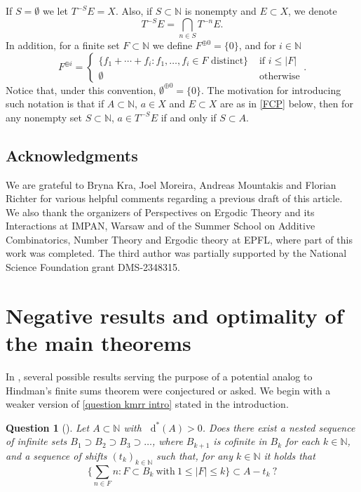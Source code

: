 \documentclass[letter, 11pt]{article}
\newtheorem{question}[theo]{Question}
\theoremstyle{definition}
\theoremstyle{plain}
\newcommand{\N}{\mathbb{N}}
\newcommand*\diff{\mathop{}\!\mathrm{d}}
\newcommand{\1}{\mathbbm{1}}
\begin{document}
If $S=\emptyset$ we let $T^{-S}E=X$. Also, if $S\subset \N$ is nonempty and $E\subset X$, we denote 
$$T^{-S}E=\bigcap_{n\in S} T^{-n}E. $$
In addition, for a finite set 
$F\subset \N$ we define $F^{\oplus 0}=\{0\}$, and for $i\in \N$ 
$$F^{\oplus i}=\begin{cases}
    \{f_1+\cdots +f_i :f_1,\ldots,f_i\in F \text{ distinct}\} & \text{ if } i\leq |F|\\
    \emptyset & \text{ otherwise}
\end{cases}.$$ 
Notice that, under this convention, $\emptyset^{\oplus 0}=\{0\}$. The motivation for introducing such notation is that if $A \subset \N$, $a \in X$ and $E \subset X$ are as in \cref{FCP} below, then for any nonempty set $S \subset \N$, $a \in T^{-S} E$ if and only if $S \subset A$. 
\subsection*{Acknowledgments}
We are grateful to Bryna Kra, Joel Moreira, Andreas Mountakis and Florian Richter for various helpful comments 
regarding a previous draft of this article. We also thank the organizers of 
Perspectives on Ergodic Theory and its Interactions at IMPAN, Warsaw and of the 
Summer School on Additive Combinatorics, Number Theory and Ergodic theory at 
EPFL, where part of this work was completed. The third author was partially supported by the National Science Foundation grant DMS-2348315.

\section{Negative results and optimality of  the main theorems}\label{counterexamples section}

In \cite{Kra_Moreira_Richter_Robertson_problems}, several possible results 
serving the purpose of a potential analog to Hindman's finite sums theorem 
were conjectured or asked. We begin with a weaker version of \cref{question kmrr intro} stated in the introduction.

\begin{question}[{\cite[Question 2.12]{Kra_Moreira_Richter_Robertson_problems}}] \label{KMRR Question 2.12}  
Let $A\subset \N$ with $\diff^*(A)>0$. Does there exist a nested sequence of infinite sets $B_1 \supset B_2 \supset B_3 \supset \dots$, where $B_{k+1}$ is cofinite in $B_k$ for each $k\in \N$, and a sequence of shifts $(t_k)_{k\in \N}$ such that, for any $k\in \N$ it holds that 
$$\bigg\{\sum_{n\in F}n: F\subset B_k\ \text{with}\ 1\leq |F|\leq k\bigg\}\subset A-t_k\ ?$$
\end{question}
\end{document}
